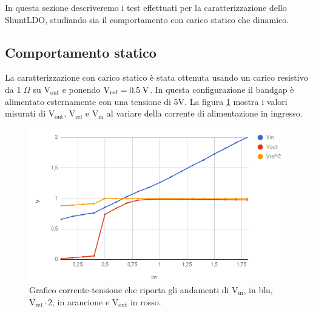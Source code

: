 In questa sezione descriveremo i test effettuati per la caratterizzazione dello ShuntLDO, studiando sia il comportamento con carico statico che dinamico.

\subsection{Comportamento statico}

La caratterizzazione con carico statico è stata ottenuta usando un carico resistivo da 1 $\Omega$ su $\mathrm{V_{out}}$ e ponendo $\mathrm{V_{ref}} = 0.5 \rm \; V$.
In questa configurazione il bandgap è alimentato esternamente con una tensione di 5V.
La figura \ref{SLDO2Astatic} mostra i valori misurati di $\mathrm{V_{out}}$, $\mathrm{V_{ref}}$ e $\mathrm{V_{in}}$ al variare della corrente di alimentazione in ingresso.

\begin{figure}
\centering
\includegraphics[scale=.5]{Immagini/SLDO2Astatic}
\caption{Grafico corrente-tensione che riporta gli andamenti di $\mathrm{V_{in}}$, in blu, $\mathrm{V_{ref}\cdot 2}$, in arancione e $\mathrm{V_{out}}$ in rosso.}
\label{SLDO2Astatic}
\end{figure}

